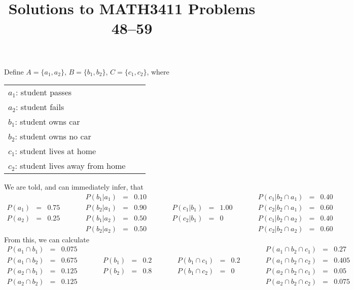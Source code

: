 \documentclass[11pt]{article}
\date{}
\author{}
\title{\sc Solutions to MATH3411 Problems 48--59}
\begin{document}
 \maketitle

\vspace*{-10mm}

Define $A = \{a_1,a_2\}$, $B = \{b_1,b_2\}$, $C = \{c_1,c_2\}$, where
\begin{center}
\begin{tabular}{lll}
  $a_1$: student passes\\
  $a_2$: student fails\\
  $b_1$: student owns car\\
  $b_2$: student owns no car\\
  $c_1$: student lives at home\\
  $c_2$: student lives away from home
\end{tabular}
\end{center}
We are told, and can immediately infer, that
  \[
    \begin{array}{lllclllclllclll}
             & &       & \qquad& P(b_1|a_1) &=& 0.10 & \qquad &            & &      &       & P(c_1|b_2\cap a_1) &=& 0.40\\
      P(a_1) &=& 0.75  &       & P(b_2|a_1) &=& 0.90 &        & P(c_1|b_1) &=& 1.00 &\qquad & P(c_2|b_2\cap a_1) &=& 0.60\\
      P(a_2) &=& 0.25  &       & P(b_1|a_2) &=& 0.50 &        & P(c_2|b_1) &=& 0    &       & P(c_1|b_2\cap a_2) &=& 0.40\\
             & &       &       & P(b_2|a_2) &=& 0.50 &        &            & &      &       & P(c_2|b_2\cap a_2) &=& 0.60
    \end{array}
  \]
From this, we can calculate
  \[
    \begin{array}{lllclllclllclll}
      P(a_1\cap b_1) &=& 0.075 & \qquad&        & &     & \qquad &                & &     &       & P(a_1\cap b_2\cap c_1) &=& 0.27 \\
      P(a_1\cap b_2) &=& 0.675 &       & P(b_1) &=& 0.2 &        & P(b_1\cap c_1) &=& 0.2 &\qquad & P(a_1\cap b_2\cap c_2) &=& 0.405\\
      P(a_2\cap b_1) &=& 0.125 &       & P(b_2) &=& 0.8 &        & P(b_1\cap c_2) &=& 0   &       & P(a_2\cap b_2\cap c_1) &=& 0.05 \\
      P(a_2\cap b_2) &=& 0.125 &       &        & &     &        &                & &     &       & P(a_2\cap b_2\cap c_2) &=& 0.075
    \end{array}
  \]
\end{document}
